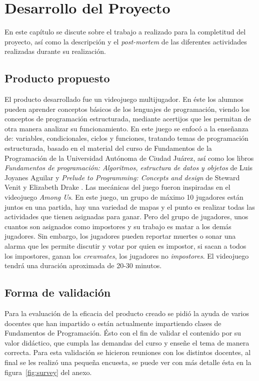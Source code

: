 \chapter{Desarrollo del Proyecto}
En este capítulo se discute sobre el trabajo a realizado para la completitud del proyecto, así como la descripción y el \textit{post-mortem} de las diferentes actividades realizadas durante su realización.

\section{Producto propuesto}
El producto desarrollado fue un videojuego multijugador. En éste los alumnos pueden aprender conceptos básicos de los lenguajes de programación, viendo los conceptos de programación estructurada, mediante acertijos que les permitan de otra manera analizar su funcionamiento. En este juego se enfocó a la enseñanza de: variables, condicionales, ciclos y funciones, tratando temas de programación estructurada, basado en el material del curso de Fundamentos de la Programación de la Universidad Autónoma de Ciudad Juárez, así como los libros \textit{Fundamentos de programación: Algoritmos, estructura de datos y objetos} de Luis Joyanes Aguilar \cite{luisjoyanesaguilar_2020_fundamentos} y \textit{Prelude to Programming: Concepts and design} de Steward Venit y Elizabeth Drake \cite{venit_2015_prelude}. 
Las mecánicas del juego fueron inspiradas en el videojuego \textit{Among Us}. En este juego, un grupo de máximo 10 jugadores están juntos en una partida, hay una variedad de mapas y el punto es realizar todas las actividades que tienen asignadas para ganar. Pero del grupo de jugadores, unos cuantos son asignados como impostores y su trabajo es matar a los demás jugadores. Sin embargo, los jugadores pueden reportar muertes o sonar una alarma que les permite discutir y votar por quien es impostor, si sacan a todos los impostores, ganan los \textit{crewmates}, los jugadores no \textit{impostores}.
El videojuego tendrá una duración aproximada de 20-30 minutos.

\section{Forma de validación}
Para la evaluación de la eficacia del producto creado se pidió la ayuda de varios docentes que han impartido o están actualmente impartiendo clases de Fundamentos de Programación. Ésto con el fin de validar el contenido por su valor didáctico, que cumpla las demandas del curso y enseñe el tema de manera correcta. Para esta validación se hicieron reuniones con los distintos docentes, al final se les realizó una pequeña encuesta, se puede ver con más detalle ésta en la figura~\ref{fig:survey} del anexo. 

